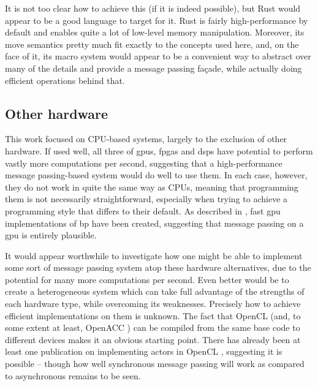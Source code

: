 It is not too clear how to achieve this (if it is indeed possible), but Rust would appear to be a good language to target for it.  Rust is fairly high-performance by default and enables quite a lot of low-level memory manipulation.  Moreover, its move semantics pretty much fit exactly to the concepts used here, and, on the face of it, its macro system would appear to be a convenient way to abstract over many of the details and provide a message passing façade, while actually doing efficient operations behind that.

\subsection{Other hardware}
This work focused on CPU-based systems, largely to the exclusion of other hardware.  If used well, all three of \glspl{gpu}, \glspl{fpga} and \glspl{dsp} have potential to perform vastly more computations per second, suggesting that a high-performance message passing-based system would do well to use them.  In each case, however, they do not work in quite the same way as CPUs, meaning that programming them is not necessarily straightforward, especially when trying to achieve a programming style that differs to their default.  As described in , fast \gls{gpu} implementations of \gls{bp} have been created, suggesting that message passing on a \gls{gpu} is entirely plausible.

It would appear worthwhile to investigate how one might be able to implement some sort of message passing system atop these hardware alternatives, due to the potential for many more computations per second.  Even better would be to create a heterogeneous system which can take full advantage of the strengths of each hardware type, while overcoming its weaknesses.  Precisely how to achieve efficient implementations on them is unknown.  The fact that OpenCL \fxerror[inline]{[ref]} (and, to some extent at least, OpenACC \fxerror[inline]{[ref]}) can be compiled from the same base code to different devices makes it an obvious starting point.   There has already been at least one publication on implementing \glspl{actor} in OpenCL \fxerror[inline]{[ref]}, suggesting it is possible -- though how well synchronous message passing will work as compared to asynchronous remains to be seen.
